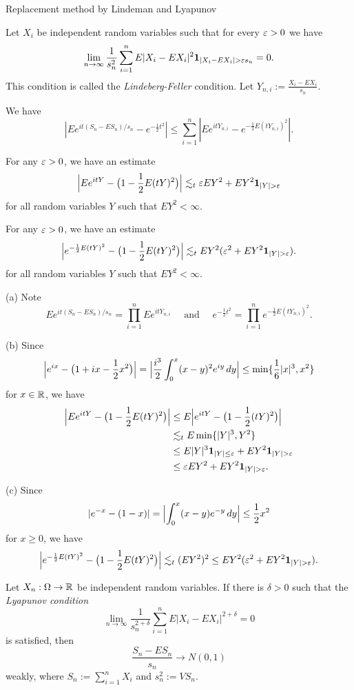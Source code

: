 \documentclass{../../large}
\begin{document}
\begin{prb}
Replacement method by Lindeman and Lyapunov
\end{prb}

\begin{prb}
Let $X_i$ be independent random variables such that for every $\varepsilon>0$ we have
\[\lim_{n\to\infty}\frac1{s_n^2}\sum_{i=1}^nE|X_i-EX_i|^2\1_{|X_i-EX_i|>\e s_n}=0.\]
This condition is called the \emph{Lindeberg-Feller} condition.
Let $Y_{n,i}:=\frac{X_i-EX_i}{s_n}$.
\begin{parts}
\item We have
\[|Ee^{it(S_n-ES_n)/s_n}-e^{-\frac12t^2}|\le\sum_{i=1}^n|Ee^{itY_{n,i}}-e^{-\frac12E(tY_{n,i})^2}|.\]
\item For any $\varepsilon>0$, we have an estimate
\[\Bigl|Ee^{itY}-\bigl(1-\frac12E(tY)^2\bigr)\Bigr|\lesssim_t\e EY^2+EY^2\1_{|Y|>\e}\]
for all random variables $Y$ such that $EY^2<\infty$.
\item For any $\varepsilon>0$, we have an estimate
\[\Bigl|e^{-\frac12E(tY)^2}-\bigl(1-\frac12E(tY)^2\bigr)\Bigr|
\lesssim_tEY^2(\e^2+EY^2\1_{|Y|>\e}).\]
for all random variables $Y$ such that $EY^2<\infty$.
\item
\end{parts}
\end{prb}
\begin{pf}
(a)
Note
\[Ee^{it(S_n-ES_n)/s_n}=\prod_{i=1}^nEe^{itY_{n,i}}\quad\text{ and }\quad e^{-\frac12t^2}=\prod_{i=1}^ne^{-\frac12E(tY_{n,i})^2}.\]

(b)
Since
\[\Bigl|e^{ix}-\bigl(1+ix-\frac12x^2\bigr)\Bigr|=\Bigl|\frac{i^3}2\int_0^x(x-y)^2e^{iy}\,dy\Bigr|\le\min\{\frac16|x|^3,x^2\}\]
for $x\in\mathbb{R}$, we have
\begin{align*}
\Bigl|Ee^{itY}-\bigl(1-\frac12E(tY)^2\bigr)\Bigr|
&\le E\Bigl|e^{itY}-\bigl(1-\frac12(tY)^2\bigr)\Bigr|\\
&\lesssim_t E\min\{|Y|^3,Y^2\}\\
&\le E|Y|^3\1_{|Y|\le\e}+EY^2\1_{|Y|>\e}\\
&\le\e EY^2+EY^2\1_{|Y|>\e}.
\end{align*}

(c)
Since
\[|e^{-x}-(1-x)|=\Bigl|\int_0^x(x-y)e^{-y}\,dy\Bigr|\le\frac12x^2\]
for $x\ge0$, we have
\[\Bigl|e^{-\frac12E(tY)^2}-\bigl(1-\frac12E(tY)^2\bigr)\Bigr|
\lesssim_t(EY^2)^2\le EY^2(\e^2+EY^2\1_{|Y|>\e}).\]
\end{pf}

\begin{prb}
Let $X_n:\Omega\to\mathbb{R}$ be independent random variables.
If there is $\delta>0$ such that the \emph{Lyapunov condition}
\[\lim_{n\to\infty}\frac1{s_n^{2+\delta}}\sum_{i=1}^nE|X_i-EX_i|^{2+\delta}=0\]
is satisfied, then
\[\frac{S_n-ES_n}{s_n}\to N(0,1)\]
weakly, where $S_n:=\sum_{i=1}^nX_i$ and $s_n^2:=VS_n$.
\end{prb}
\end{document}
